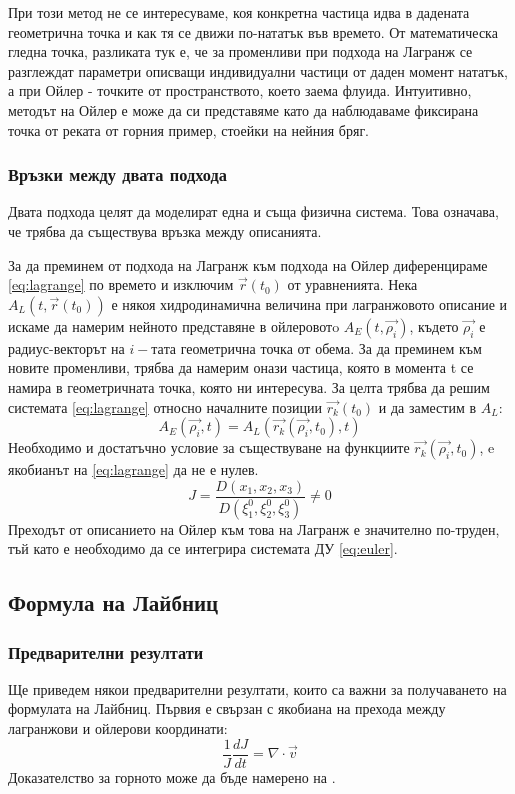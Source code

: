 При този метод не се интересуваме, коя конкретна частица идва в дадената геометрична точка и как тя се движи по-нататък във времето. От математическа гледна точка, разликата тук е, че за променливи при подхода на Лагранж се разглеждат параметри описващи индивидуални частици от даден момент нататък, а при Ойлер - точките от пространството, което
заема флуида.
Интуитивно, методът на Ойлер е може да си представяме като да наблюдаваме фиксирана точка от реката от горния пример, стоейки на нейния бряг.

\subsubsection{Връзки между двата подхода}
Двата подхода целят да моделират една и съща физична система. Това означава, че трябва да съществува връзка между описанията.

За да преминем от подхода на Лагранж към подхода на Ойлер диференцираме \autoref{eq:lagrange} по времето и изключим $\vec{r}(t_0)$ от уравненията.
Нека $A_L(t,\vec{r}(t_0))$ е някоя хидродинамична величина при лагранжовото описание и искаме да намерим нейното представяне в ойлеровотo $A_E(t,\vec{\rho_i})$, където $\vec{\rho_i}$ е радиус-векторът на $i-тата$ геометрична точка от обема.
За да преминем към новите променливи, трябва да намерим онази частица, която в момента t се намира в геометричната точка, която ни интересува. За целта трябва да решим системата \autoref{eq:lagrange} относно началните позиции
$\vec{r_k}(t_0)$ и да заместим в $A_L$:
\begin{equation}
	A_E(\vec{\rho_i},t) = A_L(\vec{r_k}(\vec{\rho_i},t_0), t)
\end{equation}
Необходимо и достатъчно условие за съществуване на функциите $\vec{r_k}(\vec{\rho_i},t_0)$, e якобианът на \autoref{eq:lagrange} да не е нулев.
\begin{equation}
	J = \frac{D(x_1, x_2,x_3)}{D(\xi^{0}_1,\xi^{0}_2,\xi^{0}_3)} \ne 0
\end{equation}
Преходът от описанието на Ойлер към това на Лагранж е значително по-труден, тъй като е необходимо да се интегрира системата ДУ \autoref{eq:euler}.

\subsection{Формула на Лайбниц}
\subsubsection{Предварителни резултати}
\label{sec:prelimenary_leibniz}
Ще приведем някои предварителни резултати, които са важни за получаването на формулата на Лайбниц.
Първия е свързан с якобиана на прехода между лагранжови и ойлерови координати:
\begin{equation}
	\frac{1}{J}\frac{d J}{d t} = \nabla \cdot \vec{v}
	\label{eq:jacobian_div}
\end{equation}
Доказателство за горното може да бъде намерено на \cite{zapryanov_jacobian}.


